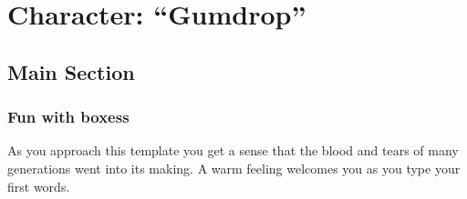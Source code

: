 \documentclass[10pt,twoside,twocolumn,openany]{book}
\begin{document}
\selectfont %


\chapter{Character: “Gumdrop”}


{\vspace{-3em}}

\section{Main Section}

\lipsum[1] %

\newpage

\lipsum[1] %

\subsection{Fun with boxess}

\begin{quotebox}
	As you approach this template you get a sense that the blood and tears of many generations went into its making. A warm feeling welcomes you as you type your first words.
\end{quotebox}
\end{document}

